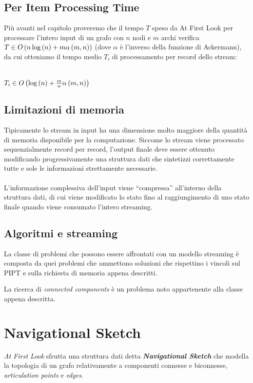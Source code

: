 \documentclass[a4paper,11pt]{report}
\begin{document}
\subsection{Per Item Processing Time}
Più avanti nel capitolo proveremo che il tempo $T$ speso da At First Look per processare l'intero input di un grafo con $n$ nodi e $m$ archi
verifica
$T \in O \left(n\* \log\left(n\right) + m\alpha\left(m,n\right)\right)$ (dove $\alpha$ è l'inverso della funzione di Ackermann),  da cui
otteniamo il tempo medio $T_i$ di processamento per 
record dello stream:\\\\
\centerline{$T_i \in O\left( \log \left( n\right)+{m\over{n}}\alpha\left(m,n \right) \right)$}
\subsection{Limitazioni di memoria}
Tipicamente lo stream in input ha una dimensione molto maggiore della quantità di memoria disponibile per la computazione. Siccome lo stream
viene processato 
sequenzialmente record per record, l'output finale deve essere ottenuto modificando progressivamente una struttura dati che sintetizzi
correttamente tutte e sole
le informazioni strettamente necessarie.
\paragraph{} 
L'informazione complessiva dell'input viene ``compressa'' all'interno della struttura dati, di cui viene modificato lo stato fino al
raggiungimento di
 uno stato finale quando viene consumato l'intero streaming.
\subsection{Algoritmi e streaming}
La classe di problemi che possono essere affrontati con un modello streaming è composta da quei problemi che ammettono soluzioni che
rispettino i vincoli
sul PIPT e sulla richiesta di memoria appena descritti. \par
La ricerca di \emph{connected components} è un problema noto appartenente alla classe appena descritta.

\section{Navigational Sketch}
\emph{At First Look} sfrutta una struttura dati detta \emph{\textbf{Navigational Sketch}} che modella la topologia di un grafo relativamente
a componenti connesse e biconnesse, 
\emph{articulation points} e \emph{edges}.
\end{document}
